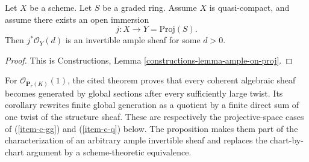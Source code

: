 \begin{lemma}
\label{lemma-open-in-proj-ample}
Let $X$ be a scheme.
Let $S$ be a graded ring. Assume $X$ is quasi-compact,
and assume there exists an open immersion
$$
j : X \longrightarrow Y = \text{Proj}(S).
$$
Then $j^*\mathcal{O}_Y(d)$ is an invertible ample sheaf
for some $d > 0$.
\end{lemma}

\begin{proof}
This is Constructions, Lemma \ref{constructions-lemma-ample-on-proj}.
\end{proof}

\begin{proposition}
\label{proposition-characterize-ample}
\begin{reference}
\cite[Chapter III, \S 2, no. 55, Theorem 1 and Corollary,
pp. 247--248]{FAC}
\cite[Chapter III, \S 3, no. 66, Theorem 2(a), p. 259]{FAC}
\end{reference}
\begin{history}
For $\mathcal{O}_{\mathbf{P}_r(K)}(1)$, the cited theorem proves that every
coherent algebraic sheaf becomes generated by global sections after every
sufficiently large twist. Its corollary rewrites finite global generation as
a quotient by a finite direct sum of one twist of the structure sheaf. These
are respectively the projective-space cases of
(\ref{item-c-gg}) and (\ref{item-c-q}) below. The proposition makes them
part of the characterization of an arbitrary ample invertible sheaf and
replaces the chart-by-chart argument by a scheme-theoretic equivalence.


\end{history}
\end{proposition}
